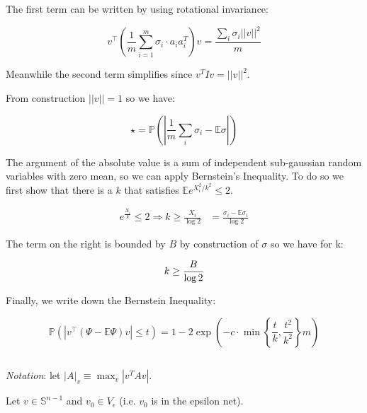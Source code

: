 \documentclass{article}
\begin{document}
The first term can be written by using rotational invariance:

\begin{equation}
	v^\top \left(\frac{1}{m} \sum^{m}_{i=1} 	\sigma_i \cdot a_ia_i^T \right) v = 
	\frac{\sum_i\sigma_i ||v||^2}{m}
\end{equation}

Meanwhile the second term simplifies since $v^TIv = ||v||^2$. 

From construction $||v|| = 1$ so we have:

\begin{equation}
\star = \mathbb{P} \left(\left|\frac{1}{m}\sum_i \sigma_i - \mathbb{E}\sigma \right| \right)
\end{equation}

The argument of the absolute value is a sum of independent sub-gaussian random variables with zero mean, so we can apply Bernstein's Inequality. To do so we first show that there is a $k$ that satisfies $\mathbb{E} e^{X_i^2/k^2}\leq 2$. 

\begin{equation}
\begin{split}
	e^{\frac{X_i}{k}}\leq 2 \Rightarrow k \geq \frac{X_i}{\log{2}} &= \frac{\sigma_i - \mathbb{E}\sigma_i}{\log 2}
\end{split}
\end{equation}

The term on the right is bounded by $B$ by construction of $\sigma$ so we have for k:

\begin{equation}
k \geq \frac{B}{\log 2}\\
\end{equation}

Finally, we write down the Bernstein Inequality:

\begin{equation}
	\mathbb{P}\left( \left| v^\top \left( \Psi-\mathbb{E}\Psi \right) v \right| \leq t\right) = 
	1 - 2\exp{\left( -c \cdot \min{\left\{ \frac{t}{k},\frac{t^2}{k^2}   \right\}} m \right)}
\end{equation}

\subsection{}

\textit{Notation}: let $|A|_v\equiv \max_{v}\left| v^TAv \right|$.



Let $v\in\mathbb{S}^{n-1}$ and $v_0\in V_\epsilon$ (i.e. $v_0$ is in the epsilon net).
\end{document}

